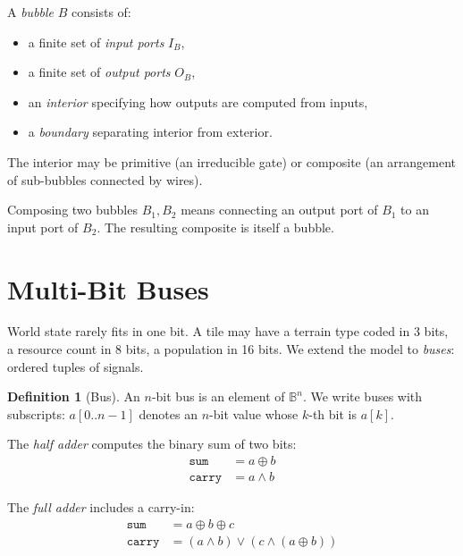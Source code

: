 \documentclass[11pt,a4paper,openany]{book}
\theoremstyle{plain}
\theoremstyle{definition}
\newtheorem{definition}[theorem]{Definition}
\theoremstyle{remark}
\newenvironment{defbox}[1]{%
  \begin{tcolorbox}[
    title={\textbf{Definition:} #1},
    colback=defbg,
    colframe=sphereamber!80,
    fonttitle=\bfseries,
    coltitle=sphereamber!60!black,
    sharp corners,
    breakable,
    before upper={\normalfont\setlength{\parindent}{0pt}\tolerance=9999\hbadness=9999}
  ]
}{\end{tcolorbox}}
\newcommand{\bool}{\mathbb{B}}
\newcommand{\AND}{\ensuremath{\wedge}}
\newcommand{\OR}{\ensuremath{\vee}}
\newcommand{\XOR}{\ensuremath{\oplus}}
\begin{document}
\begin{defbox}{Bubble}
  A \emph{bubble} $B$ consists of:
  \begin{itemize}
    \item a finite set of \emph{input ports} $I_B$,
    \item a finite set of \emph{output ports} $O_B$,
    \item an \emph{interior} specifying how outputs are computed from inputs,
    \item a \emph{boundary} separating interior from exterior.
  \end{itemize}
  The interior may be primitive (an irreducible gate) or composite
  (an arrangement of sub-bubbles connected by wires).
\end{defbox}

Composing two bubbles $B_1, B_2$ means connecting an output port of $B_1$
to an input port of $B_2$. The resulting composite is itself a bubble.

\section{Multi-Bit Buses}

World state rarely fits in one bit. A tile may have a terrain type coded
in 3 bits, a resource count in 8 bits, a population in 16 bits. We extend
the model to \emph{buses}: ordered tuples of signals.

\begin{definition}[Bus]
  An $n$-bit bus is an element of $\bool^n$. We write buses with subscripts:
  $a[0..n{-}1]$ denotes an $n$-bit value whose $k$-th bit is $a[k]$.
\end{definition}

\begin{defbox}{Half Adder}
  The \emph{half adder} computes the binary sum of two bits:
  \begin{align*}
    \texttt{sum}  &= a \XOR b \\
    \texttt{carry} &= a \AND b
  \end{align*}
\end{defbox}

\begin{defbox}{Full Adder}
  The \emph{full adder} includes a carry-in:
  \begin{align*}
    \texttt{sum}   &= a \XOR b \XOR c \\
    \texttt{carry} &= (a \AND b) \OR (c \AND (a \XOR b))
  \end{align*}
\end{defbox}
\end{document}
